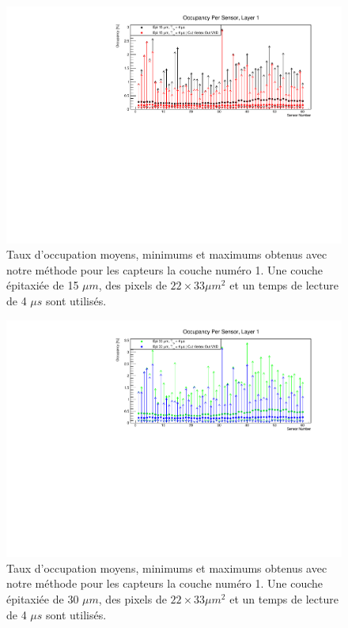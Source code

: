 \begin{appendices}
  \begin{figure}[!htb]
    \begin{center}
      \includegraphics[scale=0.80]{./figures/sensors_Readout_Time/resultOccupancyPerSensor/occupancyPerSensor_Layer1_epi_15um_Min_Max.pdf}
      \caption{Taux d'occupation moyens, minimums et maximums obtenus avec notre m\'ethode pour les capteurs la couche num\'ero 1. Une couche \'epitaxi\'ee de 15 $\mu m$, des pixels de $22 \times 33 \mu m^2$ et un temps de lecture de 4 $\mu s$ sont utilis\'es.}
      \label{fig:OccupancyLayer1_epi15um_Min_Max}
    \end{center}
  \end{figure}
  
  \begin{figure}[!htb]
    \begin{center}
      \includegraphics[scale=0.80]{./figures/sensors_Readout_Time/resultOccupancyPerSensor/occupancyPerSensor_Layer1_epi_30um_Min_Max.pdf}
      \caption{Taux d'occupation moyens, minimums et maximums obtenus avec notre m\'ethode pour les capteurs la couche num\'ero 1. Une couche \'epitaxi\'ee de 30 $\mu m$, des pixels de $22 \times 33 \mu m^2$ et un temps de lecture de 4 $\mu s$ sont utilis\'es.}
      \label{fig:OccupancyLayer1_epi30um_Min_Max}
    \end{center}
  \end{figure}
  

\end{appendices}
